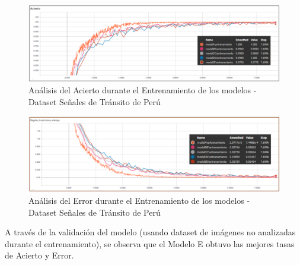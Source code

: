 			\begin{figure}[H]
				\includegraphics[width=1\textwidth, height=\textheight,keepaspectratio]{images/desarrollo/trainResults/peruSummary_entreAcierto} 
				\begin{center}
				\caption{\small{Análisis del Acierto durante el Entrenamiento de los modelos - Dataset Señales de Tránsito de Perú}}
				
				{\small{\fontsize{10}{16.8}\selectfont {Fuente: Elaboración propia}}}
				\end{center}
				\vspace{-1.5em}
			\end{figure}	

			\begin{figure}[H]
				\includegraphics[width=1\textwidth, height=\textheight,keepaspectratio]{images/desarrollo/trainResults/peruSummary_entreError} 
				\begin{center}
				\caption{\small{Análisis del Error durante el Entrenamiento de los modelos - Dataset Señales de Tránsito de Perú}}
				
				{\small{\fontsize{10}{16.8}\selectfont {Fuente: Elaboración propia}}}
				\end{center}
				\vspace{-1.5em}
			\end{figure}	


			A través de la validación del modelo (usando dataset de imágenes no analizadas durante el entrenamiento), se observa que el Modelo E obtuvo las mejores tasas de Acierto y Error. 

